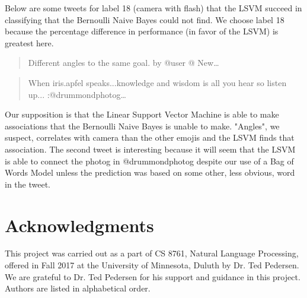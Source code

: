 \documentclass[11pt,a4paper]{article}
\begin{document}
Below are some tweets for label 18 (camera with flash) that the LSVM succeed in classifying that the Bernoulli Naive Bayes could not find. We choose label 18 because the percentage difference in performance (in favor of the LSVM) is greatest here.

\begin{quote}
Different angles to the same goal. by @user @ New…
\end{quote}

\begin{quote}
When iris.apfel speaks...knowledge and wisdom is all you hear so listen up... :@drummondphotog…
\end{quote}

Our supposition is that the Linear Support Vector Machine is able to make associations that the Bernoulli Naive Bayes is unable to make. "Angles", we suspect, correlates with camera than the other emojis and the LSVM finds that association. The second tweet is interesting because it will seem that the LSVM is able to connect the photog in @drummondphotog despite our use of a Bag of Words Model unless the prediction was based on some other, less obvious, word in the tweet.

\section*{Acknowledgments}

This project was carried out as a part of CS 8761, Natural Language Processing, offered in Fall 2017 at the University of Minnesota, Duluth by Dr. Ted Pedersen. We are grateful to Dr. Ted Pedersen for his support and guidance in this project. Authors are listed in alphabetical order.

%
%


\end{document}
